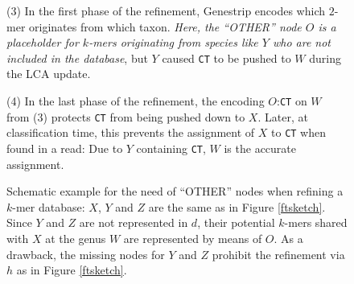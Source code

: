 \documentclass[pdflatex,sn-vancouver-num]{sn-jnl}
\begin{document}
\begin{figure}[!htbp]
\begin{minipage}[c]{0.25\textwidth}
\begin{flushleft}(3) In the first phase of the refinement, Genestrip encodes which $2$-mer originates from which taxon. \emph{Here, the \enquote{OTHER} node $O$ is a placeholder for $k$-mers originating from species like $Y$ who are not included in the database}, but $Y$ caused \texttt{CT} to be pushed to $W$ during the LCA update.
\end{flushleft}
\end{minipage}
\begin{minipage}[c]{0.2\textwidth}
\end{minipage}
\begin{minipage}[c]{0.25\textwidth}
\begin{flushleft}(4) In the last phase of the refinement, the encoding $O$:\texttt{CT} on $W$ from (3) protects \texttt{CT} from being pushed down to $X$. Later, at classification time, this prevents the assignment of $X$ to \texttt{CT} when found in a read: Due to $Y$ containing \texttt{CT},  $W$ is the accurate assignment.\end{flushleft}
\end{minipage}
\begin{minipage}[c]{0.2\textwidth}
\end{minipage}

\vspace{0.2cm}

\caption{Schematic example for the need of \enquote{OTHER} nodes when refining a $k$-mer database:
$X$, $Y$ and $Z$ are the same as in Figure \ref{ftsketch}. Since $Y$ and $Z$ are not represented in $d$, their potential $k$-mers shared with $X$ at the genus $W$ are represented by means of $O$. As a drawback, the missing nodes for $Y$ and $Z$ prohibit the refinement via $h$ as in Figure \ref{ftsketch}.}\label{ftother}
\end{figure}
\end{document}
